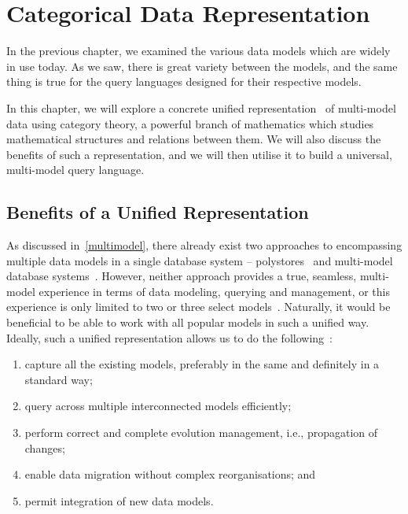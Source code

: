 \chapter{Categorical Data Representation}
\label{categorical:chapter}

In the previous chapter, we examined the various data models which are widely in use today.
As we saw, there is great variety between the models, and the same thing is true for the query languages designed for their respective models.

In this chapter, we will explore a concrete unified representation~\cite{unified_representation}\cite{one_model} of multi-model data using category theory, a powerful branch of mathematics which studies mathematical structures and relations between them.
We will also discuss the benefits of such a representation, and we will then utilise it to build a universal, multi-model query language.

\section{Benefits of a Unified Representation}

As discussed in~\cref{multimodel}, there already exist two approaches to encompassing multiple data models in a single database system -- polystores~\cite{polystores}\cite{polystores2} and multi-model database systems~\cite{multimodel_dbs}\cite{multimodel_dbs2}.
However, neither approach provides a true, seamless, multi-model experience in terms of data modeling, querying and management, or this experience is only limited to two or three select models~\cite{multimodel_dbs2}.
Naturally, it would be beneficial to be able to work with all popular models in such a unified way.
Ideally, such a unified representation allows us to do the following~\cite{unified_representation}:

\begin{enumerate}
    \item capture all the existing models, preferably in the same and definitely in a standard way; 
    \item query across multiple interconnected models efficiently; 
    \item perform correct and complete evolution management, i.e., propagation of changes; 
    \item enable data migration without complex reorganisations; and 
    \item permit integration of new data models.
\end{enumerate}

